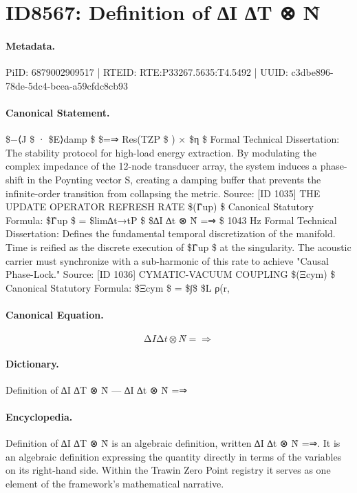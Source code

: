\section*{ID8567: Definition of ∆I ∆T ⊗ N̂}
\paragraph{Metadata.}
PiID: 6879002909517 | RTEID: RTE:P33267.5635:T4.5492 | UUID: c3dbe896-78de-5dc4-bcea-a59cfdc8cb93

\paragraph{Canonical Statement.}
\$−⟨J \$ · \$E⟩damp \$ \$=⇒ Res(TZP \$ ) × \$η \$ Formal Technical Dissertation: The stability protocol for high-load energy extraction. By modulating the complex impedance of the 12-node transducer array, the system induces a phase-shift in the Poynting vector S, creating a damping buffer that prevents the infinite-order transition from collapsing the metric. Source: [ID 1035] THE UPDATE OPERATOR REFRESH RATE \$(Γ̂up) \$ Canonical Statutory Formula: \$Γ̂up \$ = \$lim∆t→tP \$ \$∆I ∆t ⊗ N̂ =⇒ \$ 1043 Hz Formal Technical Dissertation: Defines the fundamental temporal discretization of the manifold. Time is reified as the discrete execution of \$Γ̂up \$ at the singularity. The acoustic carrier must synchronize with a sub-harmonic of this rate to achieve "Causal Phase-Lock." Source: [ID 1036] CYMATIC-VACUUM COUPLING \$(Ξcym) \$ Canonical Statutory Formula: \$Ξcym \$ = \$∫\$ \$L ρ(r,

\paragraph{Canonical Equation.}
\[
∆I ∆t ⊗ N̂ =⇒
\]

\paragraph{Dictionary.}
Definition of ∆I ∆T ⊗ N̂ — ∆I ∆t ⊗ N̂ =⇒

\paragraph{Encyclopedia.}
Definition of ∆I ∆T ⊗ N̂ is an algebraic definition, written ∆I ∆t ⊗ N̂ =⇒. It is an algebraic definition expressing the quantity directly in terms of the variables on its right-hand side. Within the Trawin Zero Point registry it serves as one element of the framework's mathematical narrative.
